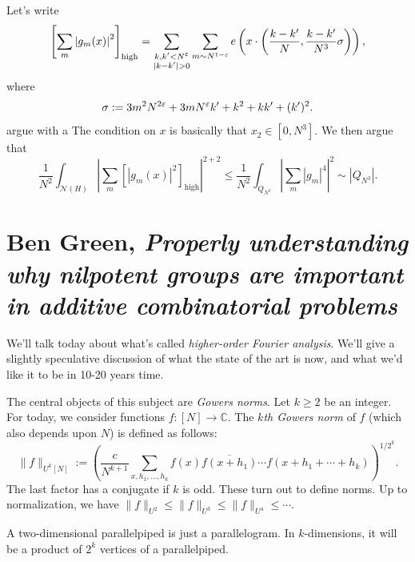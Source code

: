 \documentclass[reqno]{amsart} 
\numberwithin{theorem}{section}
\numberwithin{equation}{section}
\begin{document}
Let's write
\begin{equation*}
  \left[ \sum_m \left\lvert g_m(x) \right\rvert^2  \right]_{\mathrm{high}}
  = \sum_{
    \substack{
      k, k ' < N^\varepsilon  \\
      \lvert k - k ' \rvert > 0
    }
  }
  \sum_{m \sim N^{1 - \varepsilon}}
  e \left( x \cdot \left( \frac{k - k '}{N}, \frac{k - k'}{N^3} \sigma \right) \right),
\end{equation*}
where
\begin{equation*}
  \sigma := 3 m^2 N^{2 \varepsilon} + 3 m N^\varepsilon k ' + k^2 + k k' +(k ')^2.
\end{equation*}argue with a
The condition on $x$ is basically that $x_2 \in[0, N^3]$.  We then argue that
\begin{equation*}
  \frac{1}{N^2} \int_{\mathcal{N}(H)} \left\lvert \sum_{m}
    \left[ \left\lvert g_m(x) \right\rvert^2 \right]_{\mathrm{high}}\right\rvert^{2 + 2}
  \leq \frac{1}{N^2} \int_{Q_{N^3}} \left\lvert \sum_m \left\lvert g_m \right\rvert^4 \right\rvert^2 \sim \left\lvert Q_{N^3} \right\rvert.
\end{equation*}

\section{Ben Green, \emph{Properly understanding why nilpotent groups are important in additive combinatorial problems}}

We'll talk today about what's called \emph{higher-order Fourier analysis}.  We'll give a slightly speculative discussion of what the state of the art is now, and what we'd like it to be in 10-20 years time.

The central objects of this subject are \emph{Gowers norms}.  Let $k \geq 2$ be an integer.  For today, we consider functions $f :[N] \rightarrow \mathbb{C}$.  The $k$\emph{th Gowers norm} of $f$ (which also depends upon $N$) is defined as follows:
\begin{equation*}
  \lVert f \rVert_{U^k[N]} :=
  \left( \frac{c}{N^{k + 1}} \sum_{x, h_1, \dotsc, h_k}
    f(x) \overline{f(x + h_1)}
    \dotsb
    f(x + h_1 + \dotsb + h_k) \right)^{1/2^k}.
\end{equation*}
The last factor has a conjugate if $k$ is odd.  These turn out to define norms.  Up to normalization, we have $\lVert f \rVert_{U^2} \leq \lVert f \rVert_{U^3} \leq \lVert f \rVert_{U^4} \leq \dotsb$.

A two-dimensional parallelpiped is just a parallelogram.  In $k$-dimensions, it will be a product of $2^k$ vertices of a parallelpiped.
\end{document}
